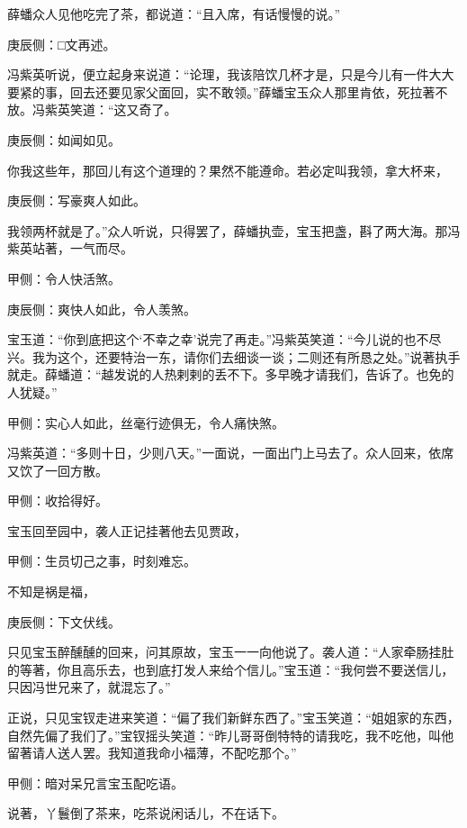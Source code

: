 \begin{parag}
    薛蟠众人见他吃完了茶，都说道：“且入席，有话慢慢的说。”\begin{note}庚辰侧：□文再述。\end{note}冯紫英听说，便立起身来说道：“论理，我该陪饮几杯才是，只是今儿有一件大大要紧的事，回去还要见家父面回，实不敢领。”薛蟠宝玉众人那里肯依，死拉著不放。冯紫英笑道：“这又奇了。\begin{note}庚辰侧：如闻如见。\end{note}你我这些年，那回儿有这个道理的？果然不能遵命。若必定叫我领，拿大杯来，\begin{note}庚辰侧：写豪爽人如此。\end{note}我领两杯就是了。”众人听说，只得罢了，薛蟠执壶，宝玉把盏，斟了两大海。那冯紫英站著，一气而尽。\begin{note}甲侧：令人快活煞。\end{note}\begin{note}庚辰侧：爽快人如此，令人羡煞。\end{note}宝玉道：“你到底把这个‘不幸之幸’说完了再走。”冯紫英笑道：“今儿说的也不尽兴。我为这个，还要特治一东，请你们去细谈一谈；二则还有所恳之处。”说著执手就走。薛蟠道：“越发说的人热剌剌的丢不下。多早晚才请我们，告诉了。也免的人犹疑。”\begin{note}甲侧：实心人如此，丝毫行迹俱无，令人痛快煞。\end{note}冯紫英道：“多则十日，少则八天。”一面说，一面出门上马去了。众人回来，依席又饮了一回方散。\begin{note}甲侧：收拾得好。\end{note}
\end{parag}


\begin{parag}
    宝玉回至园中，袭人正记挂著他去见贾政，\begin{note}甲侧：生员切己之事，时刻难忘。\end{note}不知是祸是福，\begin{note}庚辰侧：下文伏线。\end{note}只见宝玉醉醺醺的回来，问其原故，宝玉一一向他说了。袭人道：“人家牵肠挂肚的等著，你且高乐去，也到底打发人来给个信儿。”宝玉道：“我何尝不要送信儿，只因冯世兄来了，就混忘了。”
\end{parag}


\begin{parag}
    正说，只见宝钗走进来笑道：“偏了我们新鲜东西了。”宝玉笑道：“姐姐家的东西，自然先偏了我们了。”宝钗摇头笑道：“昨儿哥哥倒特特的请我吃，我不吃他，叫他留著请人送人罢。我知道我命小福薄，不配吃那个。”\begin{note}甲侧：暗对呆兄言宝玉配吃语。\end{note}说著，丫鬟倒了茶来，吃茶说闲话儿，不在话下。
\end{parag}


